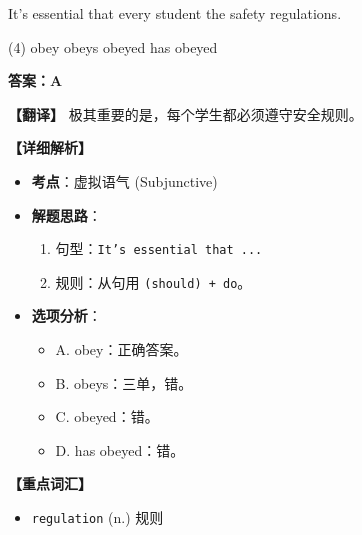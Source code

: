 \documentclass[11pt, a4paper]{article}
\newcommand{\analysis}[4]{
    \begin{solutionbox}
        \textbf{答案：#1}
        
        \textbf{【翻译】} #2
        
        \textbf{【详细解析】}
        #3
        
        \textbf{【重点词汇】}
        #4
    \end{solutionbox}
}
\newcommand{\blank}{\underline{\hspace{1.5cm}}}
\begin{document}
\begin{questions}
    \item It's essential that every student \blank the safety regulations.
    \begin{tasks}(4)
        \task obey \task obeys \task obeyed \task has obeyed
    \end{tasks}
    \analysis{A}{极其重要的是，每个学生都必须遵守安全规则。}{
        \begin{itemize}
            \item \textbf{考点}：虚拟语气 (Subjunctive)
            \item \textbf{解题思路}：
                \begin{enumerate}
                    \item 句型：\texttt{It's essential that ...}
                    \item 规则：从句用 \texttt{(should) + do}。
                \end{enumerate}
            \item \textbf{选项分析}：
                \begin{itemize}
                    \item A. obey：正确答案。
                    \item B. obeys：三单，错。
                    \item C. obeyed：错。
                    \item D. has obeyed：错。
                \end{itemize}
        \end{itemize}
    }{
        \begin{itemize}
            \item \texttt{regulation} (n.) 规则
        \end{itemize}
    }


\end{questions}
\end{document}
